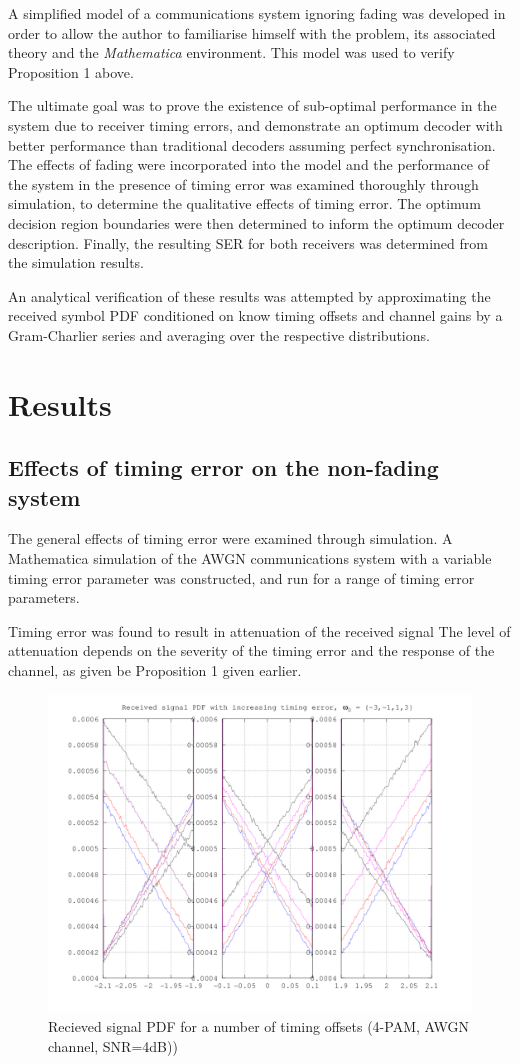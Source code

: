 A simplified model of a communications system ignoring fading was developed in order to allow the author to familiarise himself with the problem, its associated theory and the \emph{Mathematica} environment. This model was used to verify Proposition 1 above.

The ultimate goal was to prove the existence of sub-optimal performance in the system due to receiver timing errors, and demonstrate an optimum decoder with better performance than traditional decoders assuming perfect synchronisation. The effects of fading were incorporated into the model and the performance of the system in the presence of timing error was examined thoroughly through simulation, to determine the qualitative effects of timing error. The optimum decision region boundaries were then determined to inform the optimum decoder description. Finally, the resulting SER for both receivers was determined from the simulation results.

An analytical verification of these results was attempted by approximating the received symbol PDF conditioned on know timing offsets and channel gains by a Gram-Charlier series and averaging over the respective distributions.

\chapter{Results}

\section{Effects of timing error on the non-fading system}

The general effects of timing error were examined through simulation. A Mathematica simulation of the AWGN communications system with a variable timing error parameter was constructed, and run for a range of timing error parameters.

Timing error was found to result in attenuation of the received signal The level of attenuation depends on the severity of the timing error and the response of the channel, as given be Proposition 1 given earlier.

\begin{figure}[htbp]
\centering
\includegraphics[width=0.8\linewidth]{../../../plots/4pamdecisionerror.png}
\caption[Non-fading received symbol PDF]{Recieved signal PDF for a number of timing offsets (4-PAM, AWGN channel, SNR=4dB))}
\end{figure}

